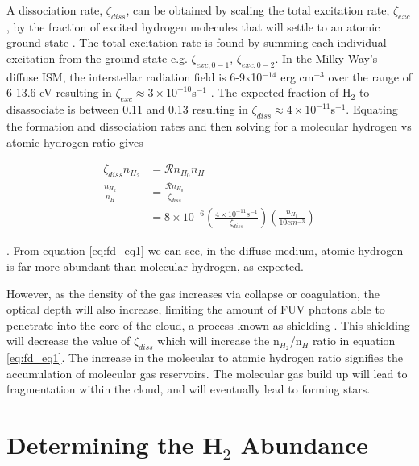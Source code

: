 A dissociation rate, $\zeta_{diss}$, can be obtained by scaling the total excitation rate, $\zeta_{exc}$, by the fraction of excited hydrogen molecules that will settle to an atomic ground state \citep{krumholz2014}.  The total excitation rate is found by summing each individual excitation from the ground state e.g. $\zeta_{exc,0-1}$, $\zeta_{exc,0-2}$.  In the Milky Way's diffuse ISM, the interstellar radiation field is 6-9x10$^{-14}$ erg cm$^{-3}$ over the range of 6-13.6 eV resulting in $\zeta_{exc} \approx 3\times10^{-10}$s$^{-1}$ \citep{draine2011}.  The expected fraction of H$_2$ to disassociate is between 0.11 and 0.13 resulting in $\zeta_{diss}\approx4\times10^{-11}$s$^{-1}$\citep{draine2011}.
Equating the formation and dissociation rates and then solving for a molecular hydrogen vs atomic hydrogen ratio gives

\begin{equation}\label{eq:fd_eq1}
  \begin{split}
    \zeta_{diss} n_{H_2} & = \mathcal{R}n_{H_0}n_H \\
    \frac{n_{H_2}}{n_H} & = \frac{\mathcal{R}n_{H_0}}{\zeta_{diss}} \\
                        & = 8\times10^{-6}\left(\frac{4\times10^{-11}s^{-1}}{\zeta_{diss}}\right)\left(\frac{n_{H_0}}{10cm^{-3}}\right)
  \end{split}
\end{equation}

\noindent \citep{krumholz2014}.  From equation \ref{eq:fd_eq1} we can see, in the diffuse medium, atomic hydrogen is far more abundant than molecular hydrogen, as expected.

However, as the density of the gas increases via collapse or coagulation, the optical depth will also increase, limiting the amount of FUV photons able to penetrate into the core of the cloud, a process known as shielding \citep{draine2011}.  This shielding will decrease the value of $\zeta_{diss}$ which will increase the n$_{H_2}$/n$_H$ ratio in equation \ref{eq:fd_eq1}.  The increase in the molecular to atomic hydrogen ratio signifies the accumulation of molecular gas reservoirs.  The molecular gas build up will lead to fragmentation within the cloud, and will eventually lead to forming stars.  

\section{Determining the H$_2$ Abundance}

